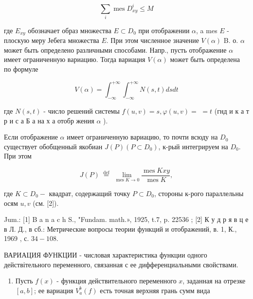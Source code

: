 \documentclass[10pt]{article}
\begin{document}
\[

\sum_{i} \operatorname{mes} D_{x y}^{i} \leqslant M

\]



где $E_{x y}$ обозначает образ множества $E \subset D_{0}$ при отображении $\alpha$, a mes $E$ - плоскую меру Јебега множества $E$. При этом численное значение $V(\alpha)$ B. о. $\alpha$ может быть определено различными способами. Напр., пусть отображение $\alpha$ имеет ограниченную вариацию. Тогда вариация $V(\alpha)$ может быть определена по формуле



\[

V(\alpha)=\int_{-\infty}^{+\infty} \int_{-\infty}^{+\infty} N(s, t) d s d t

\]



где $N(s, t)$ - число решений системы $f(u, v)=s, \varphi(u, v)=$ $=t$ (гнд и к а т р и с а Б а на х а отобр жения $\alpha$ ).



Если отображение $\alpha$ имеет ограниченную вариацию, то почти всюду на $D_{0}$ существует обобщенный якобиан $J(P)\left(P \subset D_{0}\right)$, к-рый интегрируем на $D_{0}$. При этом



\[

J(P) \stackrel{\text { def }}{=} \lim _{\operatorname{mes} K \rightarrow 0} \frac{\operatorname{mes} K x y}{\operatorname{mes} K},

\]



где $K \subset D_{0}-$ квадрат, содержащий точку $P \subset D_{0}$, стороны к-рого параллельны осям $u, v$ (см. [2]).



Jum.: [1] B a n a c h S., "Fundam. math.», 1925, t.7, p. 22536 ; [2] К у д р я в ц е в Л. Д., в сб.: Метрические вопросы теории функций и отображений, в. 1, К., 1969 , с. $34-108$.



ВАРИАЦИЯ ФУНКЦИИ - числовая характеристика функции одного действітельного переменного, связанная с ее дифференциальными свойствами.



\begin{enumerate}

  \item Пусть $f(x)$ - функция действительного переменного $x$, заданная на отрезке $[a, b]$; ее вариация $V_{a}^{b}(f)$ есть точная верхняя грань сумм вида

\end{enumerate}
\end{document}
